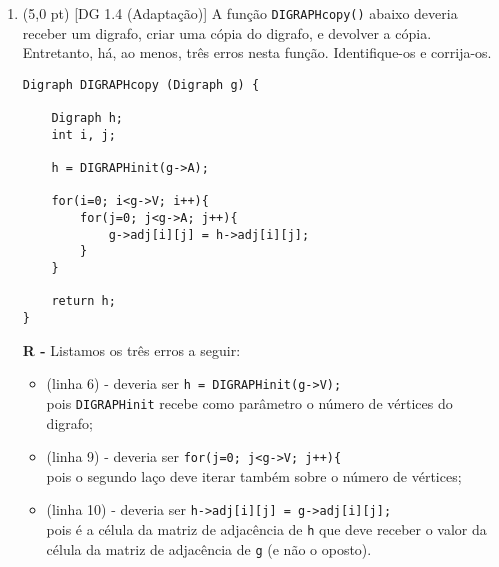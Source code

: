 \documentclass[12pt,a4paper,oneside]{article}
\begin{document}
\begin{enumerate}
	\vspace{0.3cm}

	{\color{blue}
		{\bf R -} Não, não é verdade. Seja $G$ o circuito $v_1v_2v_3v_4v_5v_1$. $G$ tem ao menos dois conjuntos estáveis maximais que contém $v_1$: $X = \{ v_1, v_3 \}$ e $Y = \{ v_1, v_4 \}$. Como $v_1$ é comum a $X$ e a $Y$, logo $X \cap Y \not= \emptyset$.
	}

\newpage

	\item (5,0 pt) [DG 1.4 (Adaptação)] A função {\tt DIGRAPHcopy()} abaixo deveria receber um digrafo, criar uma cópia do digrafo, e devolver a cópia. Entretanto, há, ao menos, três erros nesta função. Identifique-os e corrija-os.
	
	\begin{lstlisting}
Digraph DIGRAPHcopy (Digraph g) {
	
	Digraph h;
	int i, j;
	
	h = DIGRAPHinit(g->A);
	
	for(i=0; i<g->V; i++){
		for(j=0; j<g->A; j++){
			g->adj[i][j] = h->adj[i][j];
		}	
	}
	
	return h;
}
\end{lstlisting}

	\vspace{0.3cm}

	{\color{blue}
		{\bf R -} Listamos os três erros a seguir:
		\begin{itemize}
			\item (linha 6) - deveria ser {\tt h = DIGRAPHinit(g->V);}\\
			pois {\tt DIGRAPHinit} recebe como parâmetro o número de vértices do digrafo;
			\item (linha 9) - deveria ser {\tt for(j=0; j<g->V; j++)\{}\\
			pois o segundo laço deve iterar também sobre o número de vértices;
			\item (linha 10) - deveria ser {\tt h->adj[i][j] = g->adj[i][j];}\\
			pois é a célula da matriz de adjacência de {\tt h} que deve receber o valor da célula da matriz de adjacência de {\tt g} (e não o oposto).
		\end{itemize}
	}
	
	\end{enumerate}
\end{document}
